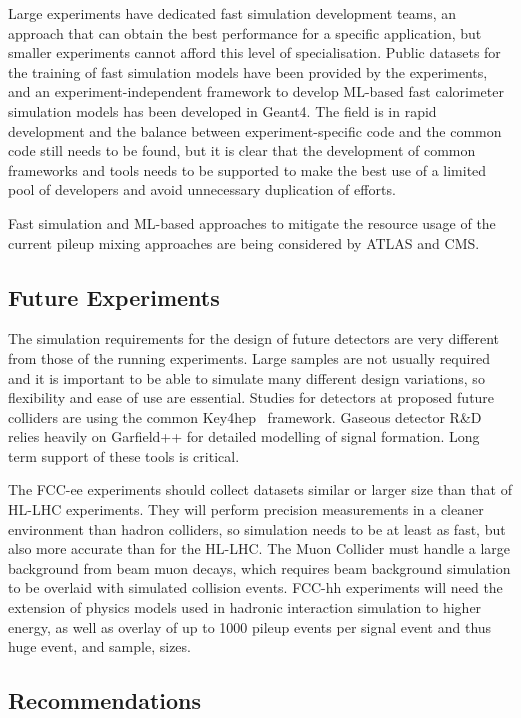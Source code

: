 \documentclass[10pt,a4paper]{article}
\begin{document}
Large experiments have dedicated fast simulation development teams, an approach
that can obtain the best performance for a specific application, but smaller
experiments cannot afford this level of specialisation. Public datasets for the
training of fast simulation models have been provided by the experiments, and an
experiment-independent framework to develop ML-based fast calorimeter simulation
models has been developed in Geant4. The field is in rapid development and the
balance between experiment-specific code and the common code still needs to be
found, but it is clear that the development of common frameworks and tools needs
to be supported to make the best use of a limited pool of developers and avoid
unnecessary duplication of efforts.

Fast simulation and ML-based approaches to mitigate the resource usage
of the current pileup mixing approaches are being considered by ATLAS
and CMS.

\subsection{Future Experiments}\label{future-experiments}

The simulation requirements for the design of future detectors are very
different from those of the running experiments. Large samples are not
usually required and it is important to be able to simulate many
different design variations, so flexibility and ease of use are
essential. Studies for detectors at proposed future colliders are using
the common Key4hep~\cite{Ganis2022} framework. Gaseous detector R\&D relies
heavily on Garfield++\cite{garfield++} for detailed modelling of signal
formation. Long term support of these tools is critical.

The FCC-ee experiments should collect datasets similar or
larger size than that of HL-LHC experiments. They will perform precision
measurements in a cleaner environment than hadron colliders, so simulation
needs to be at least as fast, but also more accurate than for the HL-LHC. The
Muon Collider must handle a large background from beam muon decays, which
requires beam background simulation to be overlaid with simulated collision
events. FCC-hh experiments will need the extension of physics models used in
hadronic interaction simulation to higher energy, as well as overlay of up to
1000 pileup events per signal event and thus huge event, and sample, sizes.

\subsection{Recommendations}\label{recommendations-1}
\end{document}
